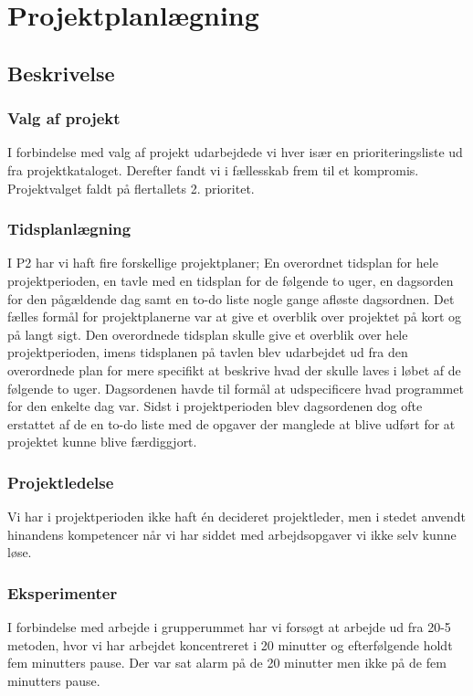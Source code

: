 \chapter{Projektplanlægning}

\section{Beskrivelse}

\subsection{Valg af projekt}
I forbindelse med valg af projekt udarbejdede vi hver især en prioriteringsliste ud fra projektkataloget. Derefter fandt vi i fællesskab frem til et kompromis. Projektvalget faldt på flertallets 2. prioritet.
\subsection{Tidsplanlægning}
I P2 har vi haft fire forskellige projektplaner; En overordnet tidsplan for hele projektperioden, en tavle med en tidsplan for de følgende to uger, en dagsorden for den pågældende dag samt en to-do liste nogle gange afløste dagsordnen. 
Det fælles formål for projektplanerne var at give et overblik over projektet på kort og på langt sigt.
Den overordnede tidsplan skulle give et overblik over hele projektperioden, imens tidsplanen på tavlen blev udarbejdet ud fra den overordnede plan for mere specifikt at beskrive hvad der skulle laves i løbet af de følgende to uger. Dagsordenen havde til formål at udspecificere hvad programmet for den enkelte dag var. Sidst i projektperioden blev dagsordenen dog ofte erstattet af de en to-do liste med de opgaver der manglede at blive udført for at projektet kunne blive færdiggjort.

\subsection{Projektledelse}
Vi har i projektperioden ikke haft én decideret projektleder, men i stedet anvendt hinandens kompetencer når vi har siddet med arbejdsopgaver vi ikke selv kunne løse.

\subsection{Eksperimenter}
I forbindelse med arbejde i grupperummet har vi forsøgt at arbejde ud fra 20-5 metoden, hvor vi har arbejdet koncentreret i 20 minutter og efterfølgende holdt fem minutters pause. Der var sat alarm på de 20 minutter men ikke på de fem minutters pause. 

